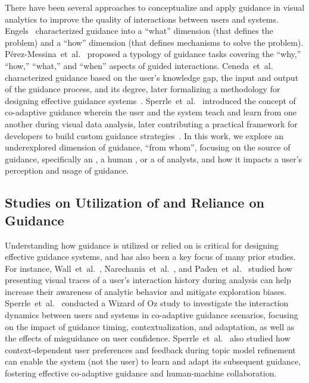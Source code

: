 There have been several approaches to conceptualize and apply guidance in visual analytics to improve the quality of interactions between users and systems.
Engels~\cite{engels1996planning} characterized guidance into a ``what'' dimension (that defines the problem) and a ``how'' dimension (that defines mechanisms to solve the problem). 
Pérez-Messina~et~al.~\cite{perez2022typology} proposed a typology of guidance tasks covering the ``why,'' ``how,'' ``what,'' and ``when'' aspects of guided interactions.
Ceneda~et~al.~\cite{ceneda2016characterizing, ceneda2017amending} characterized guidance based on the user's knowledge gap, the input and output of the guidance process, and its degree, later formalizing a methodology for designing effective guidance systems~\cite{ceneda2020guide}. 
Sperrle~et~al.~\cite{sperrle2020learning, sperrle2021co, sperrle2021topicmodelrefinement} introduced the concept of co-adaptive guidance wherein the user and the system teach and learn from one another during visual data analysis, later contributing a practical framework for developers to build custom guidance strategies~\cite{sperrle2022lotse}.
In this work, we explore an underexplored dimension of guidance, ``from whom'', focusing on the source of guidance, specifically an \ai{}, a human \expert{}, or a \group{} of analysts, and how it impacts a user's perception and usage of guidance.


\subsection{Studies on Utilization of and Reliance on Guidance}
Understanding how guidance is utilized or relied on is critical for designing effective guidance systems, and has also been a key focus of many prior studies.
For instance, 
Wall~et~al.~\cite{wall2021lrg}, Narechania~et~al.~\cite{narechania2021lumos}, and Paden~et~al.~\cite{paden2024biasbuzz} studied how presenting visual traces of a user's interaction history during analysis can help increase their awareness of analytic behavior and mitigate exploration biases.
Sperrle~et~al.~\cite{sperrle2024wizardofozguidance} conducted a Wizard of Oz study to investigate the interaction dynamics between users and systems in co-adaptive guidance scenarios, focusing on the impact of guidance timing, contextualization, and adaptation, as well as the effects of misguidance on user confidence.
Sperrle~et~al.~\cite{sperrle2021learning} also studied how context-dependent user preferences and feedback during topic model refinement can enable the system (not the user) to learn and adapt its subsequent guidance, fostering effective co-adaptive guidance and human-machine collaboration.

